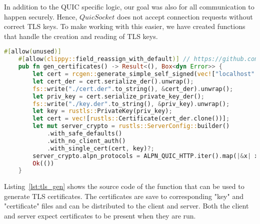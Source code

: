 In addition to the QUIC specific logic, our goal was also for all communication to happen securely.
Hence, $QuicSocket$ does not accept connection requests without correct TLS keys.
To make working with this easier, we have created functions that handle the creation and reading of TLS keys.

\newpage

\begin{lstlisting}[language=Rust, caption={The $gen_certificates$ function that can be used to generate appropriate TLS certificates.}, label=lst:tls_gen]
    #[allow(unused)]
    #[allow(clippy::field_reassign_with_default)] // https://github.com/rust-lang/rust-clippy/issues/6527
    pub fn gen_certificates() -> Result<(), Box<dyn Error>> {
        let cert = rcgen::generate_simple_self_signed(vec!["localhost".into()]).unwrap();
        let cert_der = cert.serialize_der().unwrap();
        fs::write("./cert.der".to_string(), &cert_der).unwrap();
        let priv_key = cert.serialize_private_key_der();
        fs::write("./key.der".to_string(), &priv_key).unwrap();
        let key = rustls::PrivateKey(priv_key);
        let cert = vec![rustls::Certificate(cert_der.clone())];
        let mut server_crypto = rustls::ServerConfig::builder()
            .with_safe_defaults()
            .with_no_client_auth()
            .with_single_cert(cert, key)?;
        server_crypto.alpn_protocols = ALPN_QUIC_HTTP.iter().map(|&x| x.into()).collect();
        Ok(())
    }
\end{lstlisting}

Listing~\ref{lst:tls_gen} shows the source code of the function that can be used to generate TLS certificates.
The certificates are save to corresponding "key" and "certificate" files and can be distributed to the client and server.
Both the client and server expect certificates to be present when they are run.
